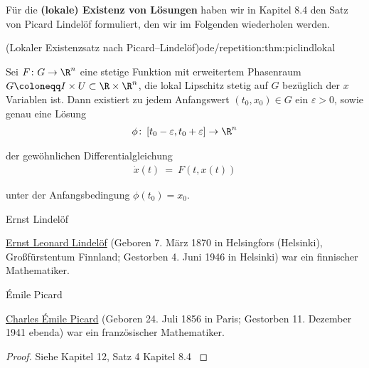 \documentclass[letterpaper,10pt,german]{jupyterBook}
\begin{document}
\par
Für die \textbf{(lokale) Existenz von Lösungen} haben wir in Kapitel 8.4 \cite{Ten21} den Satz von Picard Lindelöf formuliert, den wir im Folgenden wiederholen werden.
\begin{theorem}{(Lokaler Existenzsatz nach Picard–Lindelöf)}{ode/repetition:thm:piclindlokal}



\par
Sei \(F\colon G\to\R^n\) eine stetige Funktion mit erweitertem Phasenraum \(G \coloneqq I \times U \subset \R\times\R^n\), die lokal Lipschitz stetig auf \(G\) bezüglich der \(x\) Variablen ist.
Dann existiert zu jedem Anfangswert \((t_0,x_0) \in G\) ein \(\varepsilon>0\), sowie genau eine Lösung
\begin{align*}
\phi \colon \left[t_0-\varepsilon, t_0+\varepsilon\right] \to \R^n
\end{align*}
\par
der gewöhnlichen Differentialgleichung
\begin{align*}
\dot{x}(t) \ = \ F(t,x(t))
\end{align*}
\par
unter der Anfangsbedingung \(\phi(t_0)=x_0\).
\end{theorem}

\begin{emphBox}{Ernst Lindelöf}{}

\par
\href{https://en.wikipedia.org/wiki/Ernst\_Leonard\_Lindel\%C3\%B6f}{Ernst Leonard Lindelöf} (Geboren 7. März 1870 in Helsingfors (Helsinki), Großfürstentum Finnland; Gestorben 4. Juni 1946 in Helsinki) war ein finnischer Mathematiker.
\end{emphBox}

\begin{emphBox}{Émile Picard}{}

\par
\href{https://de.wikipedia.org/wiki/\%C3\%89mile\_Picard}{Charles Émile Picard} (Geboren 24. Juli 1856 in Paris; Gestorben 11. Dezember 1941 ebenda) war ein französischer Mathematiker.
\end{emphBox}

\begin{proof}
 Siehe Kapitel 12, Satz 4 Kapitel 8.4 \cite{For17}
\end{proof}
\end{document}
